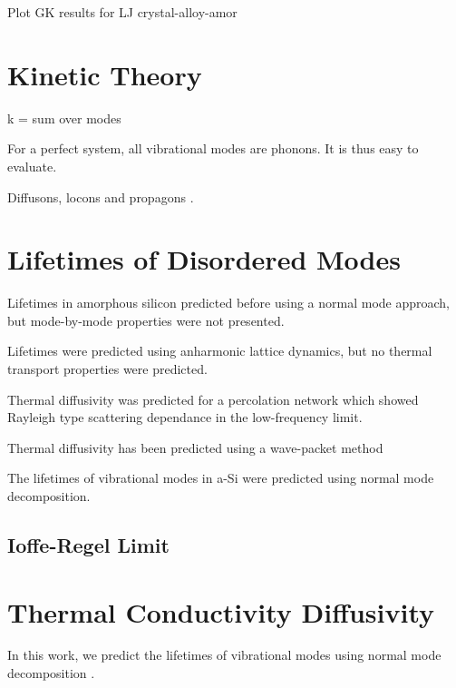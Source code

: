 \documentclass[aps,prb,preprint,superscriptaddress,amsmath,amssymb,floatfix]{revtex4}
\begin{document}
Plot GK results for LJ crystal-alloy-amor


\section{\label{S:Lifetimes}Kinetic Theory}

k = sum over modes

For a perfect system, all vibrational modes are phonons.  It is thus easy 
to evaluate.

Diffusons, locons and propagons \cite{allen_diffusons_1999}.

\section{\label{S:Lifetimes}Lifetimes of Disordered Modes}

Lifetimes in amorphous silicon predicted before using a normal mode 
approach, but mode-by-mode properties were not presented.
 \cite{bickham_calculation_1998}

Lifetimes were predicted using anharmonic lattice dynamics, but no thermal 
transport properties were predicted.\cite{fabian_anharmonic_1996}

Thermal diffusivity was predicted for a percolation network which showed 
Rayleigh type scattering dependance in the low-frequency limit.
\cite{sheng_heat_1991}

Thermal diffusivity has been predicted using a wave-packet method

The lifetimes of vibrational modes in a-Si were predicted using normal 
mode decomposition.\cite{he_heat_2011}

\subsection{\label{S:Lifetimes:}Ioffe-Regel Limit}



\section{\label{S:Lifetimes}Thermal Conductivity Diffusivity}


In this work, we predict the lifetimes of vibrational modes using normal 
mode decomposition \cite{turney_predicting_2009-1}.
\end{document}
